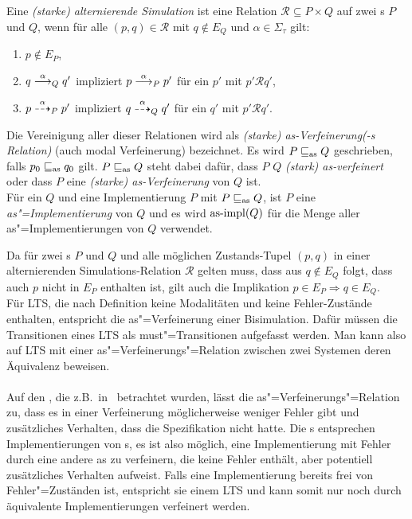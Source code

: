 \begin{Def}
  \label{SimDef}
  Eine \emph{(starke) alternierende Simulation} ist eine Relation
  $\mathcal{R}\subseteq P \times Q$ auf zwei \MEIO{}s $P$ und $Q$, wenn für
  alle $(p,q)\in \mathcal{R}$ mit $q\notin E_Q$ und $\alpha\in\Sigma _\tau$
  gilt:
  \begin{enumerate}
    \item $p\notin E_P$,
    \item $q\must[\alpha]_Q q'$ impliziert $p\must[\alpha]_P p'$ für ein $p'$
      mit $p'\mathcal{R}q'$,
    \item $p\may[\alpha]_P p'$ impliziert $q\may[\alpha]_Q q'$ für ein $q'$ mit
      $p'\mathcal{R}q'$.
  \end{enumerate}
  Die Vereinigung \asRel{} aller dieser Relationen wird als \emph{(starke)
  as-Verfeinerung(-s Relation)} (auch modal Verfeinerung) bezeichnet. Es wird
  $P\sqsubseteq _{\mathrm{as}} Q$ geschrieben, falls $p_0\sqsubseteq _{\mathrm{as}} q_0$ gilt. $P\sqsubseteq _{\mathrm{as}} Q$ steht dabei
  dafür, dass $P$ $Q$ \emph{(stark) as-verfeinert} oder dass $P$ eine
  \emph{(starke) as-Verfeinerung} von $Q$ ist.\\
  Für ein \MEIO{} $Q$ und eine Implementierung $P$ mit $P\sqsubseteq _{\mathrm{as}}{}Q$, ist
  $P$ eine \emph{as"=Implementierung} von $Q$ und es wird $\mathrm{as}\text{-}\mathrm{impl} (Q)$ für die
  Menge aller as"=Implementierungen von $Q$ verwendet.
\end{Def}

Da für zwei \MEIO{}s $P$ und $Q$ und alle möglichen Zustands-Tupel $(p,q)$ in
einer alternierenden Simulations-Relation $\mathcal{R}$ gelten muss, dass aus
$q\notin E_Q$ folgt, dass auch $p$ nicht in $E_P$ enthalten ist, gilt auch die
Implikation $p\in E_P\Rightarrow q\in E_Q$.\\
Für LTS, die nach Definition keine Modalitäten und keine Fehler-Zustände
enthalten, entspricht die as"=Verfeinerung einer Bisimulation. Dafür müssen die
Transitionen eines LTS als must"=Transitionen aufgefasst werden. Man kann also
auf LTS mit einer as"=Verfeinerungs"=Relation zwischen zwei Systemen deren
Äquivalenz beweisen.\\ \\
Auf den \EIO{}, die z.B.\ in~\cite{Schinko2016BA} betrachtet wurden, lässt die
as"=Verfeinerungs"=Relation zu, dass es in einer Verfeinerung möglicherweise
weniger Fehler gibt und zusätzliches Verhalten, dass die Spezifikation nicht
hatte. Die \EIO{}s entsprechen Implementierungen von \MEIO{}s, es ist also
möglich, eine Implementierung mit Fehler durch eine andere as zu verfeinern,
die keine Fehler enthält, aber potentiell zusätzliches Verhalten aufweist.
Falls eine Implementierung bereits frei von Fehler"=Zuständen ist, entspricht
sie einem LTS und kann somit nur noch durch äquivalente Implementierungen \glqq
verfeinert\grqq{} werden.

